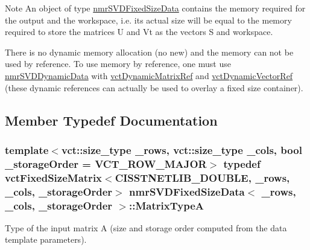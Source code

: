 \begin{DoxyNote}{Note}
An object of type \hyperlink{classnmr_s_v_d_fixed_size_data}{nmr\+S\+V\+D\+Fixed\+Size\+Data} contains the memory required for the output and the workspace, i.\+e. its actual size will be equal to the memory required to store the matrices U and Vt as the vectors S and workspace.

There is no dynamic memory allocation (no {\ttfamily new}) and the memory can not be used by reference. To use memory by reference, one must use \hyperlink{classnmr_s_v_d_dynamic_data}{nmr\+S\+V\+D\+Dynamic\+Data} with \hyperlink{classvct_dynamic_matrix_ref}{vct\+Dynamic\+Matrix\+Ref} and \hyperlink{classvct_dynamic_vector_ref}{vct\+Dynamic\+Vector\+Ref} (these dynamic references can actually be used to overlay a fixed size container). 
\end{DoxyNote}


\subsection{Member Typedef Documentation}
\hypertarget{classnmr_s_v_d_fixed_size_data_a86798e3079d3215e1ded8d48d914c45c}{}
\subsubsection[{Matrix\+Type\+A}]{\setlength{\rightskip}{0pt plus 5cm}template$<$vct\+::size\+\_\+type \+\_\+rows, vct\+::size\+\_\+type \+\_\+cols, bool \+\_\+storage\+Order = V\+C\+T\+\_\+\+R\+O\+W\+\_\+\+M\+A\+J\+O\+R$>$ typedef {\bf vct\+Fixed\+Size\+Matrix}$<$C\+I\+S\+S\+T\+N\+E\+T\+L\+I\+B\+\_\+\+D\+O\+U\+B\+L\+E, \+\_\+rows, \+\_\+cols, \+\_\+storage\+Order$>$ {\bf nmr\+S\+V\+D\+Fixed\+Size\+Data}$<$ \+\_\+rows, \+\_\+cols, \+\_\+storage\+Order $>$\+::{\bf Matrix\+Type\+A}}\label{classnmr_s_v_d_fixed_size_data_a86798e3079d3215e1ded8d48d914c45c}
Type of the input matrix A (size and storage order computed from the data template parameters). \hypertarget{classnmr_s_v_d_fixed_size_data_a4abee9caa16efd9bed6df1b4deec9207}{}
